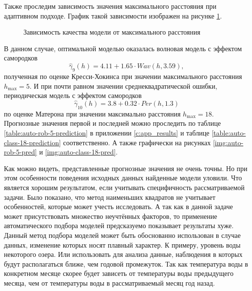 Также проследим зависимость значения максимального расстояния при адаптивном подходе. График такой зависимости изображен на рисунке \ref{img:auto-mse-cutoff}.
\begin{figure}[ht]
\caption{Зависимость качества модели от максимального расстояния}
\label{img:auto-mse-cutoff}
\end{figure}
В данном случае, оптимальной моделью оказалась волновая модель с эффектом самородков
\begin{equation*}
 	\widehat{\gamma}_9(h) = 4.11 + 1.65 \cdot Wav(h, 3.59),
\end{equation*}
полученная по оценке Кресси-Хокинса при значении максимального расстояния $ h_{\text{max}} = 5 $. И при почти равном значении среднеквадратической ошибки, периодическая модель с эффектом самородков
\begin{equation*}
 	\widehat{\gamma}_{10}(h) = 3.8 + 0.32 \cdot Per(h, 1.3)
\end{equation*}
по оценке Матерона при значении максимально расстояния $ h_{\text{max}} = 18 $. Прогнозные значения первой и последней можно проследить по таблице \ref{table:auto-rob-5-prediction} в приложении \ref{c:app_results} и таблице \ref{table:auto-class-18-prediction} соответственно. А также графически на рисунках \ref{img:auto-rob-5-pred} и \ref{img:auto-class-18-pred}.


Как можно видеть, представленные прогнозные значения не очень точны. Но при этом особенности поведения исходных данных найденные модели уловили. Что является хорошим результатом, если учитывать специфичность рассматриваемой задачи. Было показано, что метод наименьших квадратов не учитывает особенностей, которые может учесть исследовать. А так как в данной задаче может присутствовать множество неучтённых факторов, то применение автоматического подбора моделей предсказуемо показывает результаты хуже. Данный метод подбора моделей может быть обоснованно использован в случае данных, изменение которых носят плавный характер. К примеру, уровень воды некоторого озера. Или использовать для анализа данные, наблюдения в которых будут располагаться ближе, чем годовой промежуток. Так как температура воды в конкретном месяце скорее будет зависеть от температуры воды предыдущего месяца, чем от температуры воды в рассматриваемый месяц год назад.

